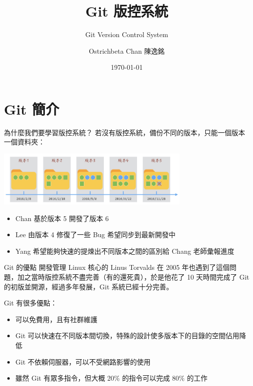 \documentclass[xetex, unicode, 10pt, aspectratio=169]{beamer}
\title{Git 版控系統}
\subtitle{Git Version Control System}
\date{\today}
\author{Ostrichbeta Chan 陳逸銘}
\institute{WHUAI Team}
\begin{document}
\maketitle

\section{Git 簡介}

\begin{frame}{為什麼我們要學習版控系統？}
    若沒有版控系統，備份不同的版本，只能一個版本一個資料夾：
    \begin{center}
        \includegraphics[width=3.75in]{./img/folders-without-vcs.png}
    \end{center}
    \begin{itemize}
        \item Chan 基於版本 5 開發了版本 6
        \item Lee 由版本 4 修復了一些 Bug 希望同步到最新開發中
        \item Yang 希望能夠快速的提煉出不同版本之間的區別給 Chang 老師彙報進度
    \end{itemize}
    \pause
    \begin{center}
    \end{center}
\end{frame}

\begin{frame}{Git 的優點}
    開發管理 Linux 核心的 Linus Torvalds 在 2005
    年也遇到了這個問題，加之當時版控系統不盡完善（有的還死貴），於是他花了 10 天時間完成了 Git 的初版並開源，經過多年發展，Git 系統已經十分完善。
    \pause

    Git 有很多優點：

    \begin{itemize}
        \item {}\quad{}可以免費用，且有社群維護
        \item {}\quad{}Git 可以快速在不同版本間切換，特殊的設計使多版本下的目錄的空間佔用降低
        \item {}\quad{}Git 不依賴伺服器，可以不受網路影響的使用
        \item {}\quad{}雖然 Git 有眾多指令，但大概 20\% 的指令可以完成 80\% 的工作
    \end{itemize}
\end{frame}
\end{document}
